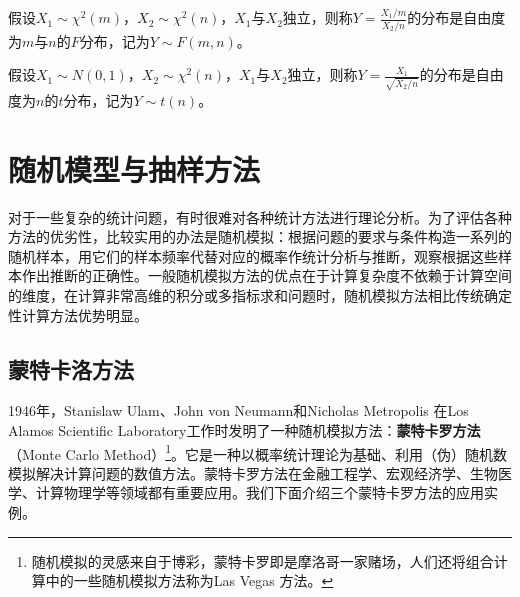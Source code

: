 \begin{definition}[$F$分布]
假设$X_1\sim \chi^2(m)$，$X_2\sim \chi^2(n)$，$X_1$与$X_2$独立，则称$Y=\frac{X_1/m}{X_2/n}$的分布是自由度为$m$与$n$的$F$分布，记为$Y\sim F(m,n)$。
\end{definition}

\begin{definition}[$t$分布\footnote{$t$分布是统计学中一类重要的分布，由英国统计学家William Gosset发现。1899年Gosset开始在一家酿酒厂担任酿酒化学技师，从事试验和数据分析工作。由于Gosset接触的样本容量很小，通过大量的实验数据的积累，他发现$t=\sqrt{n-1}(\bar x-\mu)/s$ 的分布与$N(0,1)$存在细微的差异，前者比$N(0,1)$尾部概率更大（厚尾）。它猜测可能存在一个新的分布族，通过深入研究于1908年以“Student”的笔名发表此项研究成果，后人为此也称$t$分布为“学生分布”。$t$ 分布的发现在统计学历史上具有划时代的意义，打破了正态分布一统天下的局面。}]
假设$X_1\sim N(0,1)$，$X_2\sim \chi^2(n)$，$X_1$与$X_2$独立，则称$Y=\frac{X_1}{\sqrt{X_2/n}}$的分布是自由度为$n$的$t$分布，记为$Y\sim t(n)$。
\end{definition}

\section{随机模型与抽样方法}%
对于一些复杂的统计问题，有时很难对各种统计方法进行理论分析。为了评估各种方法的优劣性，比较实用的办法是随机模拟：根据问题的要求与条件构造一系列的随机样本，用它们的样本频率代替对应的概率作统计分析与推断，观察根据这些样本作出推断的正确性。一般随机模拟方法的优点在于计算复杂度不依赖于计算空间的维度，在计算非常高维的积分或多指标求和问题时，随机模拟方法相比传统确定性计算方法优势明显。

\subsection{蒙特卡洛方法}
1946年，Stanislaw Ulam、John von Neumann和Nicholas Metropolis 在Los Alamos Scientific Laboratory工作时发明了一种随机模拟方法：\textbf{蒙特卡罗方法}（Monte Carlo Method）\footnote{随机模拟的灵感来自于博彩，蒙特卡罗即是摩洛哥一家赌场，人们还将组合计算中的一些随机模拟方法称为Las Vegas 方法。}。它是一种以概率统计理论为基础、利用（伪）随机数模拟解决计算问题的数值方法。蒙特卡罗方法在金融工程学、宏观经济学、生物医学、计算物理学等领域都有重要应用。我们下面介绍三个蒙特卡罗方法的应用实例。

